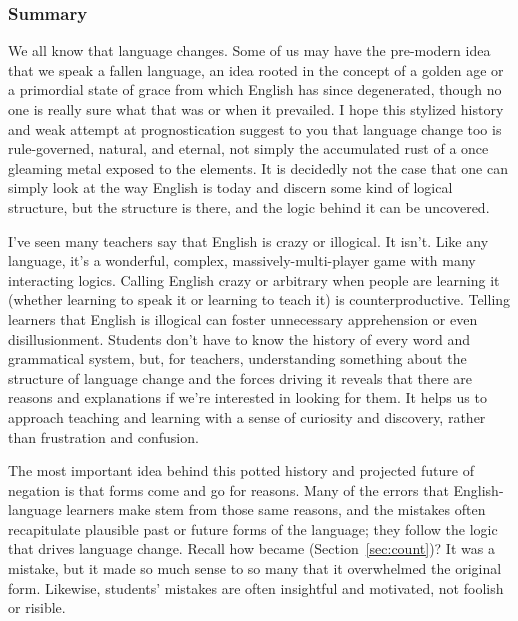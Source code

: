 

\subsubsection*{Summary}

We all know that language changes. Some of us may have the pre-modern idea that we speak a fallen language, an idea rooted in the concept of a golden age or a primordial state of grace from which English has since degenerated, though no one is really sure what that was or when it prevailed. I hope this stylized history and weak attempt at prognostication suggest to you that language change too is rule-governed, natural, and eternal, not simply the accumulated rust of a once gleaming metal exposed to the elements. It is decidedly not the case that one can simply look at the way English is today and discern some kind of logical structure, but the structure is there, and the logic behind it can be uncovered.

I've seen many teachers say that English is crazy or illogical. It isn't. Like any language, it's a wonderful, complex, massively-multi-player game with many interacting logics. Calling English crazy or arbitrary when people are learning it (whether learning to speak it or learning to teach it) is counterproductive. Telling learners that English is illogical can foster unnecessary apprehension or even disillusionment. Students don't have to know the history of every word and grammatical system, but, for teachers, understanding something about the structure of language change and the forces driving it reveals that there are reasons and explanations if we're interested in looking for them. It helps us to approach teaching and learning with a sense of curiosity and discovery, rather than frustration and confusion.

The most important idea behind this potted history and projected future of negation is that forms come and go for reasons. Many of the errors that English-language learners make stem from those same reasons, and the mistakes often recapitulate plausible past or future forms of the language; they follow the logic that drives language change. Recall how  became  (Section~\ref{sec:count})? It was a mistake, but it made so much sense to so many that it overwhelmed the original form. Likewise, students' mistakes are often insightful and motivated, not foolish or risible.

